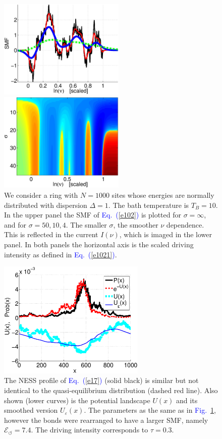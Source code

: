 \documentclass[aps,prl,floats,floatfix,twocolumn]{revtex4}
\newcommand{\Eq}[1]{\textcolor{blue}{Eq.\!\!~(\ref{#1})}}
\newcommand{\Fig}[1]{\textcolor{blue}{Fig.}\!\!~\ref{#1}}
\begin{document}
\begin{figure}
\includegraphics[width=6cm]{SMF_RW.eps}

\vspace*{5mm}

\includegraphics[width=6cm]{I_sig_tau.eps}

\caption{
We consider a ring with ${N=1000}$ sites whose energies 
are normally distributed with dispersion ${\Delta=1}$.
The bath temperature is $T_B=10$. In the upper panel 
the SMF of \Eq{e102} is plotted for $\sigma=\infty$, 
and for $\sigma=50,10,4$. The smaller $\sigma$, 
the smoother $\nu$ dependence. 
This is reflected in the current $I(\nu)$, which is 
imaged in the lower panel.  
In both panels the horizontal axis is 
the scaled driving intensity as defined in \Eq{e1021}.} 
\label{f2}
\end{figure}



\begin{figure}
\includegraphics[width=7cm]{PvsV4}

\caption{
The NESS profile of \Eq{e17} (solid black) 
is similar but not identical to the quasi-equilibrium 
distribution (dashed red line). 
Also shown (lower curves) is the potential landscape $U(x)$ 
and its smoothed version $U_{\varepsilon}(x)$. 
The parameters as the same as in \Fig{f2}, 
however the bonds were rearranged to have a larger SMF,
namely $\mathcal{E}_{\circlearrowleft}=7.4$.
The driving intensity corresponds to $\tau=0.3$.}

\label{f3}
\end{figure}
\end{document}
